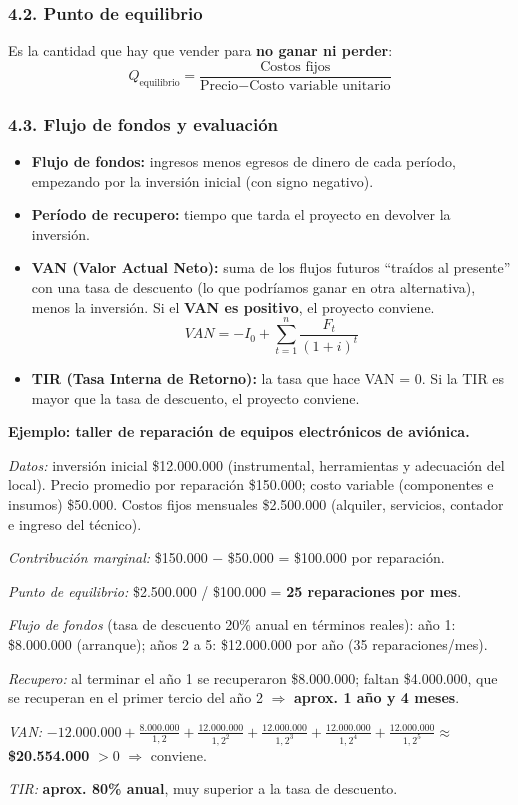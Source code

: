 \subsubsection*{4.2. Punto de equilibrio}
Es la cantidad que hay que vender para \textbf{no ganar ni perder}:
\[
Q_{\mbox{equilibrio}} = \frac{\mbox{Costos fijos}}{\mbox{Precio} - \mbox{Costo variable unitario}}
\]

\subsubsection*{4.3. Flujo de fondos y evaluación}
\begin{itemize}
  \item \textbf{Flujo de fondos:} ingresos menos egresos de dinero de cada período, empezando
        por la inversión inicial (con signo negativo).
  \item \textbf{Período de recupero:} tiempo que tarda el proyecto en devolver la inversión.
  \item \textbf{VAN (Valor Actual Neto):} suma de los flujos futuros ``traídos al presente''
        con una tasa de descuento (lo que podríamos ganar en otra alternativa), menos la
        inversión. Si el \textbf{VAN es positivo}, el proyecto conviene.
        \[
        VAN = -I_0 + \sum_{t=1}^{n} \frac{F_t}{(1+i)^t}
        \]
  \item \textbf{TIR (Tasa Interna de Retorno):} la tasa que hace VAN = 0. Si la TIR es mayor
        que la tasa de descuento, el proyecto conviene.
\end{itemize}

\begin{recuadro}
\textbf{Ejemplo: taller de reparación de equipos electrónicos de aviónica.}

\textit{Datos:} inversión inicial \$12.000.000 (instrumental, herramientas y adecuación del
local). Precio promedio por reparación \$150.000; costo variable (componentes e insumos)
\$50.000. Costos fijos mensuales \$2.500.000 (alquiler, servicios, contador e ingreso del
técnico).

\textit{Contribución marginal:} \$150.000 $-$ \$50.000 = \$100.000 por reparación.

\textit{Punto de equilibrio:} \$2.500.000 / \$100.000 = \textbf{25 reparaciones por mes}.

\textit{Flujo de fondos} (tasa de descuento 20\% anual en términos reales): año 1:
\$8.000.000 (arranque); años 2 a 5: \$12.000.000 por año (35 reparaciones/mes).

\textit{Recupero:} al terminar el año 1 se recuperaron \$8.000.000; faltan \$4.000.000, que
se recuperan en el primer tercio del año 2 $\Rightarrow$ \textbf{aprox. 1 año y 4 meses}.

\textit{VAN:} $-12.000.000 + \frac{8.000.000}{1,2} + \frac{12.000.000}{1,2^2} +
\frac{12.000.000}{1,2^3} + \frac{12.000.000}{1,2^4} + \frac{12.000.000}{1,2^5}
\approx$ \textbf{\$20.554.000} $> 0$ $\Rightarrow$ conviene.

\textit{TIR:} \textbf{aprox. 80\% anual}, muy superior a la tasa de descuento.
\end{recuadro}


